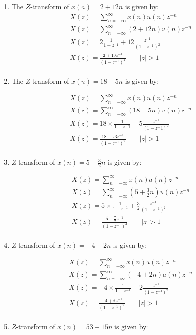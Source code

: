 \documentclass[journal,12pt,twocolumn]{IEEEtran}
\theoremstyle{remark}
\begin{document}
\begin{enumerate}
 \item 
The $Z$-transform of $x(n) = 2 + 12n$ is given by:
\begin{align}
    &X(z)= \sum_{n=-\infty}^{\infty} x(n) u(n)z^{-n}\\
    &X(z) = \sum_{n=-\infty}^{\infty} (2+12n) u(n)z^{-n}\\
    &X(z)=2 \frac{1}{1-{z^{-1}}}+ 12\frac{z^{-1}}{(1-{z^{-1}})^2}\\
    &X(z)=\frac{2+{10z^{-1}}}{(1-{z^{-1}})^2}  \qquad|z|>1 \\
\end{align}
\item
The $Z$-transform of $x(n) = 18 - 5n$ is given by:

\begin{align}
    &X(z) = \sum_{n=-\infty}^{\infty} x(n) u(n)z^{-n}\\
    &X(z) = \sum_{n=-\infty}^{\infty} (18-5n) u(n)z^{-n}\\
    &X(z)=18 \times \frac{1}{1-{z^-1}} - 5\frac{z^{-1}}{(1-{z^-1})^2}\\
    &X(z)=\frac{18-{23z^{-1}}}{(1-{z^{-1}})^2} \qquad  |z|>1 \\
\end{align}
\item 
$Z$-transform of $x(n) = 5 + \frac{3}{2}n$ is given by:

\begin{align}
    &X(z) = \sum_{n=-\infty}^{\infty} x(n) u(n)z^{-n} \\
    &X(z) = \sum_{n=-\infty}^{\infty} (5+\frac{3}{2}n) u(n)z^{-n} \\
    &X(z)=5 \times \frac{1}{1-{z^{-1}}}+ \frac{3}{2}\frac{z^{-1}}{(1-{z^{-1}})^2}\\
    &X(z)=\frac{5-\frac{7}{2}{z^{-1}}}{(1-{z^{-1}})^2} \qquad |z|>1\\
\end{align}
\item 

\vspace{2cm}
$Z$-transform of $x(n) = -4 + 2n$ is given by:

\begin{align}
       &X(z) = \sum_{n=-\infty}^{\infty} x(n) u(n)z^{-n} \\
       &X(z) = \sum_{n=-\infty}^{\infty} (-4 + 2n) u(n)z^{-n} \\
       &X(z)=-4 \times \frac{1}{1-{z^{-1}}}+ 2 \frac{z^{-1}}{(1-{z^{-1}})^2}\\
       &X(z)=\frac{-4+6{z^{-1}}}{(1-{z^{-1}})^2} \qquad  |z|>1\\
\end{align}
\item 
$Z$-transform of $x(n) = 53 - 15n$ is given by:


\end{enumerate}
\end{document}
